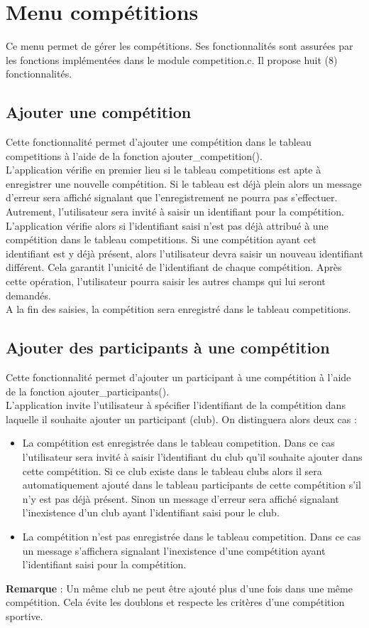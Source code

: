 \documentclass[12pt,a4paper]{report}
\begin{document}
\section{Menu compétitions}

Ce menu permet de gérer les compétitions. Ses fonctionnalités sont assurées par les fonctions implémentées dans le module competition.c. Il propose huit (8) fonctionnalités.
\subsection{Ajouter une compétition}
Cette fonctionnalité permet d'ajouter une compétition dans le tableau competitions à l'aide de la fonction ajouter\_competition().\\
L'application vérifie en premier lieu si le tableau competitions est apte à enregistrer une nouvelle compétition. Si le tableau est déjà plein alors un message d'erreur sera affiché signalant que l'enregistrement ne pourra pas s'effectuer.\\
Autrement, l'utilisateur sera invité à saisir un identifiant pour la compétition. L'application vérifie alors si l'identifiant saisi n'est pas déjà attribué à une compétition dans le tableau competitions. Si une compétition ayant cet identifiant est y déjà présent, alors l'utilisateur devra saisir un nouveau identifiant différent. Cela garantit l'unicité de l'identifiant de chaque compétition. Après cette opération, l'utilisateur pourra saisir les autres champs qui lui seront demandés.\\
A la fin des saisies, la compétition sera enregistré dans le tableau competitions.

\subsection{Ajouter des participants à une compétition}
Cette fonctionnalité permet d'ajouter un participant à une compétition à l'aide de la fonction ajouter\_participants().\\
L'application invite l'utilisateur à spécifier l'identifiant de la compétition dans laquelle il souhaite ajouter un participant (club). On distinguera alors deux cas : 
\begin{itemize}
	\item La compétition est enregistrée dans le tableau competition. Dans ce cas l'utilisateur sera invité à saisir l'identifiant du club qu'il souhaite ajouter dans cette compétition. Si ce club existe dans le tableau clubs alors il sera automatiquement ajouté dans le tableau participants de cette compétition s'il n'y est pas déjà présent. Sinon un message d'erreur sera affiché signalant l'inexistence d'un club ayant l'identifiant saisi pour le club.
	\item La compétition n'est pas enregistrée dans le tableau competition. Dans ce cas un message s'affichera signalant l'inexistence d'une compétition ayant l'identifiant saisi pour la compétition.
\end{itemize}
\textbf{Remarque} : Un même club ne peut être ajouté plus d'une fois dans une même compétition. Cela évite les doublons et respecte les critères d'une compétition sportive.
\end{document}
